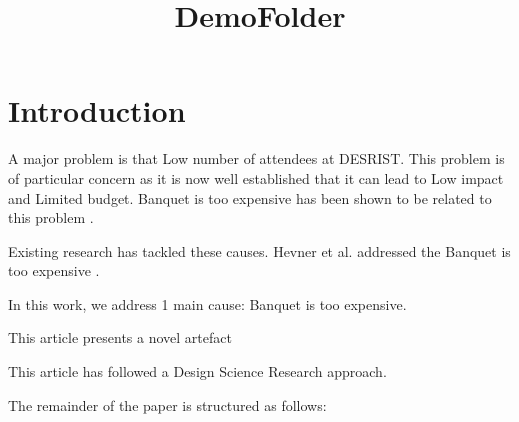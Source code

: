\documentclass{article}
\title{DemoFolder}
\author{}
\begin{document}
\maketitle
      

\section{Introduction}


    
A major problem is that Low number of attendees at DESRIST. This problem is of particular concern as it is now well established that it can lead to Low impact \cite{Hevner2004} and Limited budget. Banquet is too expensive has been shown to be related to this problem \cite{Hevner2004}. 
    
Existing research has tackled these causes. Hevner et al. addressed the Banquet is too expensive \cite{Hevner2004}. 
    
In this work, we address 1 main cause: Banquet is too expensive. 
    
This article presents a novel artefact
    

    

      
This article has followed a Design Science Research approach.

The remainder of the paper is structured as follows: 

    
      


\end{document}

